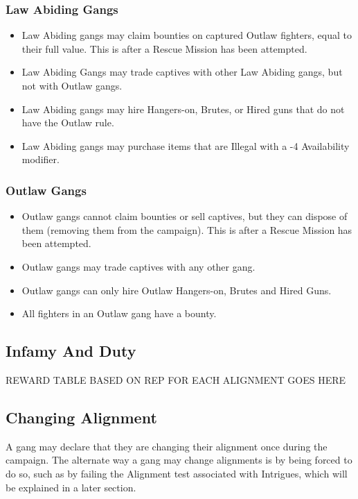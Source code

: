 \documentclass[a4paper]{article}
\begin{document}
	\begin{center}
	\begin{multicols}{2}
		\subsubsection*{Law Abiding Gangs}
		\begin{itemize}
			\item Law Abiding gangs may claim bounties on captured Outlaw fighters, equal to their full value. This is after a Rescue Mission has been attempted.
			\item Law Abiding Gangs may trade captives with other Law Abiding gangs, but not with Outlaw gangs.
			\item Law Abiding gangs may hire Hangers-on, Brutes, or Hired guns that do not have the Outlaw rule.
			\item Law Abiding gangs may purchase items that are Illegal with a -4 Availability modifier.
		\end{itemize}
		\columnbreak
		\subsubsection*{Outlaw Gangs}
		\begin{itemize}
			\item Outlaw gangs cannot claim bounties or sell captives, but they can dispose of them (removing them from the campaign). This is after a Rescue Mission has been attempted.
			\item Outlaw gangs may trade captives with any other gang.
			\item Outlaw gangs can only hire Outlaw Hangers-on, Brutes and Hired Guns.
			\item All fighters in an Outlaw gang have a bounty.
		\end{itemize}
	\end{multicols}
	\end{center}
	\pagebreak
	\subsection*{Infamy And Duty}

	REWARD TABLE BASED ON REP FOR EACH ALIGNMENT GOES HERE

	\subsection*{Changing Alignment}

	A gang may declare that they are changing their alignment once during the campaign. The alternate way a gang may change alignments is by being forced to do so, such as by failing the Alignment test associated with Intrigues, which will be explained in a later section.
\end{document}
